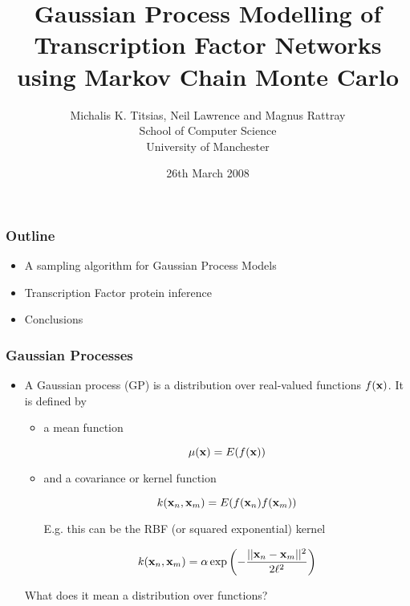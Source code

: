 \documentclass{beamer}
\title{Gaussian Process Modelling of Transcription 
Factor Networks using Markov Chain Monte Carlo}
\author{Michalis K. Titsias, Neil Lawrence and Magnus Rattray\\ 
School of Computer Science\\
University of Manchester}
\date{26th March 2008}
\begin{document}
\frame{\titlepage}



\frame
{
\frametitle{Outline}

\begin{itemize}
  \item A sampling algorithm for Gaussian Process Models 
     



  \item Transcription Factor protein inference 
 
  \item Conclusions       

  \end{itemize}

}

\frame
{

\frametitle{Gaussian Processes }

\begin{itemize}
\item A Gaussian process (GP) is a distribution 
            over real-valued functions
            \textcolor{red}{$f(\mathbf{x})$}. It is defined by 
\begin{itemize} 
\item a mean function

 $$\mu(\mathbf{x}) =  E(f(\mathbf{x}))$$  

\item and a covariance or kernel function 


$$k(\mathbf{x}_n,\mathbf{x}_m) =  E(f(\mathbf{x}_n) f(\mathbf{x}_m))$$

E.g. this can be the RBF (or squared exponential) kernel

$$
k(\mathbf{x}_n,\mathbf{x}_m) = \alpha \exp\left(
-  \frac{||\mathbf{x}_n - \mathbf{x}_m||^2 }
{2 \ell^2} \right)
$$
\end{itemize}

What does it mean a distribution over functions? 

\end{itemize}


}
\end{document}
